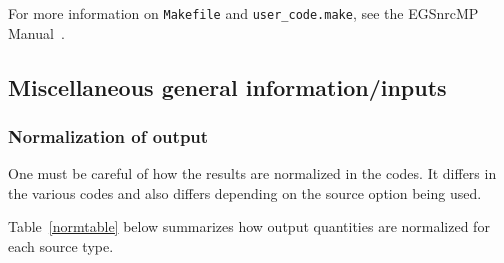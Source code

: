 \documentclass[12pt,twoside]{article}  %
\begin{document}
For more information on {\tt Makefile} and {\tt user\_code.make}, see
the EGSnrcMP Manual~\cite{Ka03}.

\subsection{Miscellaneous general information/inputs}

\subsubsection{Normalization of output}
One must be careful of how the results are normalized in the codes. It
differs in the various codes and also differs depending on the source
option being used.

Table~\ref{normtable} below summarizes how output quantities are
normalized for each source type.
\end{document}
